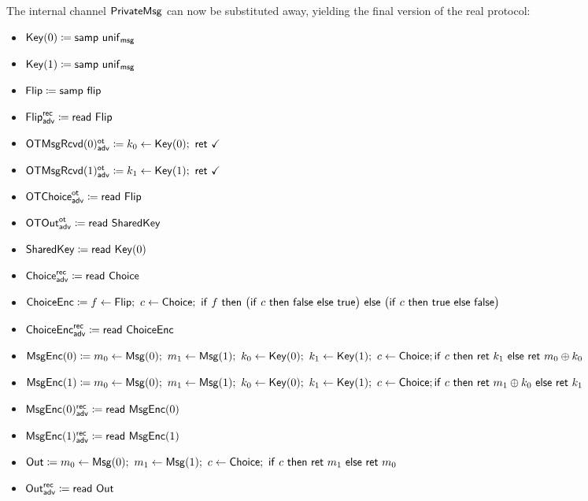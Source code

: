 \noindent The internal channel $\mathsf{PrivateMsg}$ can now be substituted away, yielding the final version of the real protocol:

\begin{itemize}
\item $\mathsf{Key}(0) \coloneqq \mathsf{samp} \ \mathsf{unif}_{\mathsf{msg}}$
\item $\mathsf{Key}(1) \coloneqq \mathsf{samp} \ \mathsf{unif}_{\mathsf{msg}}$
\item $\mathsf{Flip} \coloneqq \mathsf{samp} \ \mathsf{flip}$
\item {\color{blue} $\mathsf{Flip}^{\mathsf{rec}}_{\mathsf{adv}} \coloneqq \mathsf{read} \ \mathsf{Flip}$}
\item {\color{blue} $\LeakOTMsgRcvd(0)^\ot_\adv \coloneqq k_0 \leftarrow \Key(0); \ \ret{\checkmark}$}
\item {\color{blue} $\LeakOTMsgRcvd(1)^\ot_\adv \coloneqq k_1 \leftarrow \Key(1); \ \ret{\checkmark}$}
\item {\color{blue} $\mathsf{OTChoice}^{\mathsf{ot}}_{\mathsf{adv}} \coloneqq \mathsf{read} \ \mathsf{Flip}$}
\item {\color{blue} $\mathsf{OTOut}^{\mathsf{ot}}_{\mathsf{adv}} \coloneqq \mathsf{read} \ \mathsf{SharedKey}$}
\item $\mathsf{SharedKey} \coloneqq \mathsf{read} \ \mathsf{Key}(0)$
\item {\color{blue} $\mathsf{Choice}^{\mathsf{rec}}_{\mathsf{adv}} \coloneqq \mathsf{read} \ \mathsf{Choice}$}
\item $\ChoiceEnc \coloneqq f \leftarrow \Flip; \ c \leftarrow \Choice; \ \ifte{f}{\big(\ifte{c}{\false}{\true}\big)}{\big(\ifte{c}{\true}{\false}\big)}$
\item {\color{blue} $\mathsf{ChoiceEnc}^{\mathsf{rec}}_{\mathsf{adv}} \coloneqq \mathsf{read} \ \mathsf{ChoiceEnc}$}
\item {\color{red} $\mathsf{MsgEnc}(0) \coloneqq m_0 \leftarrow \mathsf{Msg}(0); \ m_1 \leftarrow \mathsf{Msg}(1); \ k_0 \leftarrow \mathsf{Key}(0); \ k_1 \leftarrow \mathsf{Key}(1); \ c \leftarrow \mathsf{Choice}; \\ \mathsf{if} \ c \ \mathsf{then} \ \mathsf{ret} \ k_1 \ \mathsf{else} \ \mathsf{ret} \ m_0 \oplus k_0$}
\item {\color{red} $\mathsf{MsgEnc}(1) \coloneqq m_0 \leftarrow \mathsf{Msg}(0); \ m_1 \leftarrow \mathsf{Msg}(1); \ k_0 \leftarrow \mathsf{Key}(0); \ k_1 \leftarrow \mathsf{Key}(1); \ c \leftarrow \mathsf{Choice}; \\ \mathsf{if} \ c \ \mathsf{then} \ \mathsf{ret} \ m_1 \oplus k_0 \ \mathsf{else} \ \mathsf{ret} \ k_1$}
\item {\color{blue} $\mathsf{MsgEnc}(0)^{\mathsf{rec}}_{\mathsf{adv}} \coloneqq \mathsf{read} \ \mathsf{MsgEnc}(0)$}
\item {\color{blue} $\mathsf{MsgEnc}(1)^{\mathsf{rec}}_{\mathsf{adv}} \coloneqq \mathsf{read} \ \mathsf{MsgEnc}(1)$}
\item $\Out \coloneqq m_0 \leftarrow \Msg(0); \ m_1 \leftarrow \Msg(1); \ c \leftarrow \Choice; \ \ifte{c}{\ret{m_1}}{\ret{m_0}}$
\item {\color{blue} $\mathsf{Out}^{\mathsf{rec}}_{\mathsf{adv}} \coloneqq \mathsf{read} \ \mathsf{Out}$}
\end{itemize}

